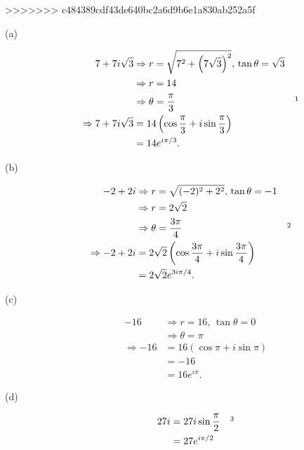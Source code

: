 \documentclass{tufte-handout}
\begin{document}
>>>>>>> c484389cdf43de640bc2a6d9b6e1a830ab252a5f
\begin{description}
\item[\textup{(a)}]
  \begin{align*}
    7 + 7i\sqrt{3} &\Rightarrow r=\sqrt{7^2 +
                     {\left(7\sqrt{3}\right)}^2}, \, \tan\theta =
                     \sqrt{3}\\
                   &\Rightarrow r = 14\\
                   &\Rightarrow \theta = {\pi \over 3} && \footnotemark\\
    \Rightarrow 7 + 7i\sqrt{3} &= 14\left(\cos{\pi \over 3} +
                                 i\sin{\pi \over 3}\right)\\
                                 &= 14e^{i\pi / 3}.
  \end{align*}

\item[\textup{(b)}]
  \begin{align*}
    -2 + 2i &\Rightarrow r = \sqrt{(-2)^2 + 2^2}, \, \tan \theta =
              -1\\
            &\Rightarrow r = 2 \sqrt 2\\
            &\Rightarrow \theta = {3\pi \over 4} && \footnotemark\\
    \Rightarrow -2 + 2i &= 2\sqrt2 \left(\cos{3\pi \over 4} +
                          i\sin{3\pi \over 4}\right)\\
            &= 2\sqrt2 e^{3i\pi / 4}.
  \end{align*}

\item[\textup{(c)}]
  \begin{align*}
    -16 &\Rightarrow r = 16, \, \tan \theta = 0\\
        &\Rightarrow \theta = \pi\\
    \Rightarrow -16 &= 16(\cos \pi + i\sin \pi)\\
        &= -16\\
        &= 16e^{i\pi}.
  \end{align*}

\item[\textup{(d)}]
  \begin{align*}
    27i &= 27i \sin {\pi \over 2} && \footnotemark\\
        &= 27e^{i\pi / 2}
  \end{align*}
\end{description}
\end{document}
